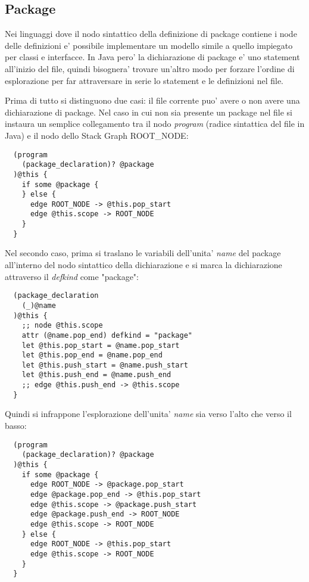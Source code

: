 \subsection{Package}

Nei linguaggi dove il nodo sintattico della definizione di package contiene i node delle definizioni e' possibile implementare un modello simile a quello impiegato per classi e interfacce.
In Java pero' la dichiarazione di package e' uno statement all'inizio del file, quindi bisognera' trovare un'altro modo per forzare l'ordine di esplorazione per far attraversare in serie lo statement e le definizioni nel file.

Prima di tutto si distinguono due casi: il file corrente puo' avere o non avere una dichiarazione di package.
Nel caso in cui non sia presente un package nel file si instaura un semplice collegamento tra il nodo \emph{program} (radice sintattica del file in Java) e il nodo dello Stack Graph ROOT\_NODE:

\begin{lstlisting}
  (program
    (package_declaration)? @package
  )@this {
    if some @package {
    } else {
      edge ROOT_NODE -> @this.pop_start
      edge @this.scope -> ROOT_NODE
    }
  }
\end{lstlisting}

Nel secondo caso, prima si traslano le variabili dell'unita' \emph{name} del package all'interno del nodo sintattico della dichiarazione e si marca la dichiarazione attraverso il \emph{defkind} come "package":

\begin{lstlisting}
  (package_declaration
    (_)@name
  )@this {
    ;; node @this.scope
    attr (@name.pop_end) defkind = "package"
    let @this.pop_start = @name.pop_start
    let @this.pop_end = @name.pop_end
    let @this.push_start = @name.push_start
    let @this.push_end = @name.push_end
    ;; edge @this.push_end -> @this.scope
  }
\end{lstlisting}

Quindi si infrappone l'esplorazione dell'unita' \emph{name} sia verso l'alto che verso il basso:

\begin{lstlisting}
  (program
    (package_declaration)? @package
  )@this {
    if some @package {
      edge ROOT_NODE -> @package.pop_start
      edge @package.pop_end -> @this.pop_start
      edge @this.scope -> @package.push_start
      edge @package.push_end -> ROOT_NODE
      edge @this.scope -> ROOT_NODE
    } else {
      edge ROOT_NODE -> @this.pop_start
      edge @this.scope -> ROOT_NODE
    }
  }
\end{lstlisting}

